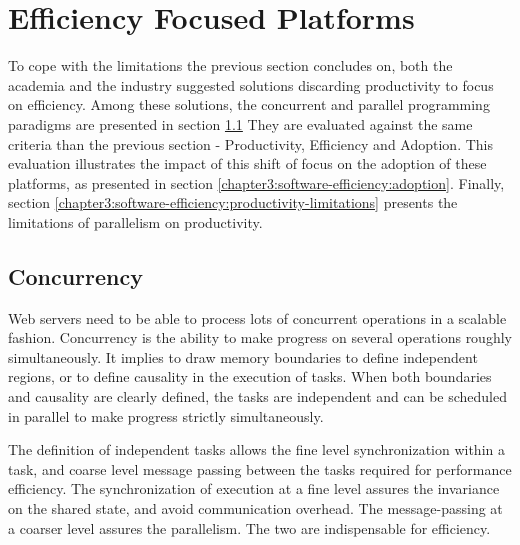 \section{Efficiency Focused Platforms} \label{chapter3:software-efficiency}

To cope with the limitations the previous section concludes on, both the academia and the industry suggested solutions discarding productivity to focus on efficiency.
Among these solutions, the concurrent and parallel programming paradigms are presented in section \ref{chapter3:software-efficiency:concurrency}
They are evaluated against the same criteria than the previous section - Productivity, Efficiency and Adoption.
This evaluation illustrates the impact of this shift of focus on the adoption of these platforms, as presented in section \ref{chapter3:software-efficiency:adoption}.
Finally, section \ref{chapter3:software-efficiency:productivity-limitations} presents the limitations of parallelism on productivity.

\subsection{Concurrency} \label{chapter3:software-efficiency:concurrency}

\begin{figure}[h!]
%
\end{figure}

Web servers need to be able to process lots of concurrent operations in a scalable fashion.
Concurrency is the ability to make progress on several operations roughly simultaneously.
It implies to draw memory boundaries to define independent regions, or to define causality in the execution of tasks.
When both boundaries and causality are clearly defined, the tasks are independent and can be scheduled in parallel to make progress strictly simultaneously.

The definition of independent tasks allows the fine level synchronization within a task, and coarse level message passing between the tasks required for performance efficiency.
The synchronization of execution at a fine level assures the invariance on the shared state, and avoid communication overhead.
The message-passing at a coarser level assures the parallelism.
The two are indispensable for efficiency.

